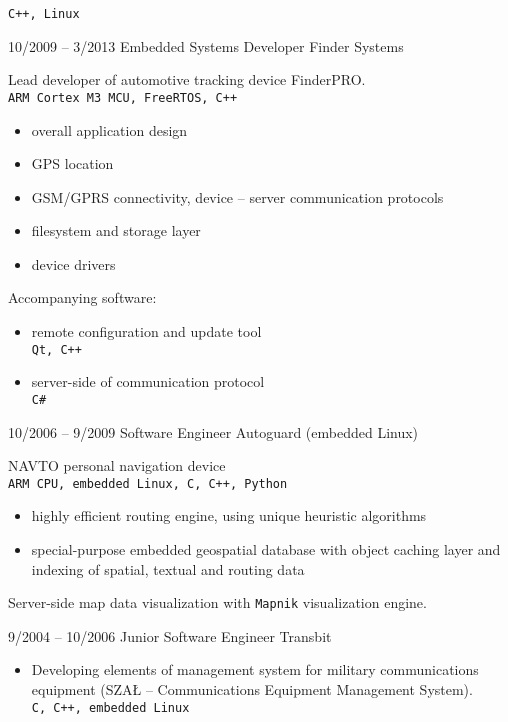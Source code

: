 \documentclass[8pt]{developercv} %
\begin{document}
\begin{entrylist}
{\begin{itemize}
                    \texttt{C++, Linux}
                  \end{itemize}
                }
	\entry
		{10/2009 -- 3/2013}
		{Embedded Systems Developer}
		{Finder Systems}
		{Lead developer of automotive tracking device FinderPRO.\\
                  \texttt{ARM Cortex M3 MCU, FreeRTOS, C++}
                  \begin{itemize}
                    \item overall application design
                    \item GPS location
                    \item GSM/GPRS connectivity, device -- server communication
                      protocols
                    \item filesystem and storage layer
                    \item device drivers
                  \end{itemize}
                  Accompanying software:
                  \begin{itemize}
                    \item remote configuration and update tool\\
                      \texttt{Qt, C++}
                    \item server-side of communication protocol\\
                      \texttt{C\#}
                  \end{itemize}
                }
        \entry
		{10/2006 -- 9/2009}
		{Software Engineer}
		{Autoguard (embedded Linux)}
		{NAVTO personal navigation device\\
                  \texttt{ARM CPU, embedded Linux, C, C++, Python}\\
                  \begin{itemize}
                    \item highly efficient routing engine,
                      using unique heuristic algorithms
                    \item special-purpose embedded geospatial database
                      with object caching layer and indexing of
                      spatial, textual and routing data
                  \end{itemize}
                  Server-side map data visualization with \texttt{Mapnik}
                  visualization engine.
                }
        \entry
		{9/2004 -- 10/2006}
		{Junior Software Engineer}
		{Transbit}
		{\begin{itemize}
                    \item Developing elements of management system for military
                      communications equipment (SZAŁ -- Communications Equipment
                      Management System).\\
                      \texttt{C, C++, embedded Linux}
                  \end{itemize}
                }
\end{entrylist}
\end{document}
